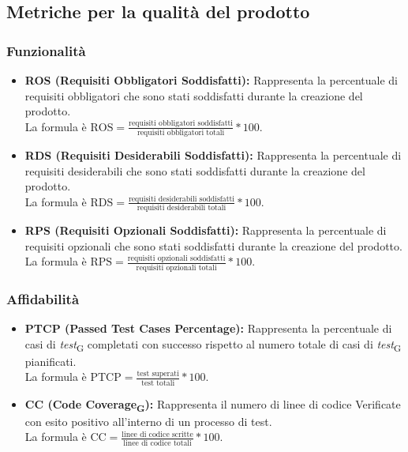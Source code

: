 \subsection{Metriche per la qualità del prodotto}
\subsubsection{Funzionalità}
\begin{itemize}
    \item \textbf{ROS (Requisiti Obbligatori Soddisfatti):} Rappresenta la percentuale di requisiti obbligatori che sono stati soddisfatti durante la creazione del prodotto.\\
    La formula è \( \text{ROS} = \frac{\text{requisiti obbligatori soddisfatti}}{\text{requisiti obbligatori totali}}*100 \).
    \item \textbf{RDS (Requisiti Desiderabili Soddisfatti):} Rappresenta la percentuale di requisiti desiderabili che sono stati soddisfatti durante la creazione del prodotto.\\
    La formula è \( \text{RDS} = \frac{\text{requisiti desiderabili soddisfatti}}{\text{requisiti desiderabili totali}}*100 \).
    \item \textbf{RPS (Requisiti Opzionali Soddisfatti):} Rappresenta la percentuale di requisiti opzionali che sono stati soddisfatti durante la creazione del prodotto.\\
    La formula è \( \text{RPS} = \frac{\text{requisiti opzionali soddisfatti}}{\text{requisiti opzionali totali}}*100 \).
\end{itemize}

\subsubsection{Affidabilità}
\begin{itemize}
    \item \textbf{PTCP (Passed Test Cases Percentage):} Rappresenta la percentuale di casi di \textit{test}\textsubscript{G} completati con successo rispetto al numero totale di casi di \textit{test}\textsubscript{G} pianificati.\\
    La formula è \( \text{PTCP} = \frac{\text{test superati}}{\text{test totali}}*100 \).
    \item \textbf{CC (Code Coverage\textsubscript{G}):} Rappresenta il numero di linee di codice Verificate con esito positivo all'interno di un processo di test.\\
    La formula è \( \text{CC} = \frac{\text{linee di codice scritte}}{\text{linee di codice totali}}*100 \).
\end{itemize}

